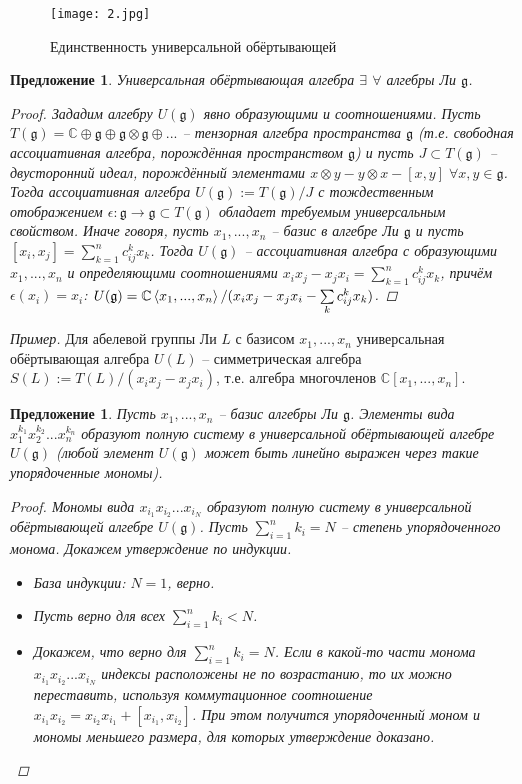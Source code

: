 \documentclass[12pt]{article}
\newtheorem{predl}[theorem]{Предложение}
\theoremstyle{definition}
\begin{document}
\begin{figure}
    \centering
    \texttt{[image: 2.jpg]}
    \caption{Единственность универсальной обёртывающей}
    \label{fig:my_label}
\end{figure}
\begin{predl}
    Универсальная обёртывающая алгебра $\exists$ $\forall$ алгебры Ли $\mathfrak{g}$.
    \begin{proof}
        Зададим алгебру $U(\mathfrak{g})$ явно образующими и соотношениями. Пусть $T(\mathfrak{g})=\mathbb{C}\oplus \mathfrak{g}\oplus\mathfrak{g}\otimes \mathfrak{g}\oplus...$ -- тензорная алгебра пространства $\mathfrak{g}$ (т.е. свободная ассоциативная алгебра, порождённая пространством $\mathfrak{g}$) и пусть $J\subset T(\mathfrak{g})$ -- двусторонний идеал, порождённый элементами $x\otimes y-y\otimes x-[x,y]\;\forall x,y\in \mathfrak{g}$. Тогда ассоциативная алгебра $U(\mathfrak{g}):=T(\mathfrak{g})/J$ с тождественным отображением $\epsilon:\mathfrak{g}\rightarrow\mathfrak{g}\subset T(\mathfrak{g})$ обладает требуемым универсальным свойством. Иначе говоря, пусть $x_1,...,x_n$ -- базис в алгебре Ли $\mathfrak{g}$ и пусть $[x_i,x_j]=\sum\limits_{k=1}^nc^k_{ij}x_k$. Тогда $U(\mathfrak{g})$ -- ассоциативная алгебра с образующими $x_1,...,x_n$ и определяющими соотношениями $x_ix_j-x_jx_i=\sum\limits_{k=1}^nc^k_{ij}x_k$, причём $\epsilon(x_i)=x_i$: $U(\mathfrak{g})=\mathbb{C}\braket{x_1,...,x_n}/(x_ix_j-x_jx_i-\sum\limits_kc^k_{ij}x_k)$.
    \end{proof}
\end{predl}
\textit{Пример.} Для абелевой группы Ли $L$ с базисом $x_1,...,x_n$ универсальная обёртывающая алгебра $U(L)$ -- симметрическая алгебра $S(L):=T(L)/(x_ix_j-x_jx_i)$, т.е. алгебра многочленов $\mathbb{C}[x_1,...,x_n]$.
\begin{predl}
    Пусть $x_1,...,x_n$ -- базис алгебры Ли $\mathfrak{g}$. Элементы вида $x_1^{k_1}x_2^{k_2}...x_n^{k_n}$ образуют полную систему в универсальной обёртывающей алгебре $U(\mathfrak{g})$ (любой элемент $U(\mathfrak{g})$ может быть линейно выражен через такие упорядоченные мономы).
    \begin{proof}
        Мономы вида $x_{i_1}x_{i_2}...x_{i_N}$ образуют полную систему в универсальной обёртывающей алгебре $U(\mathfrak{g})$. Пусть $\sum\limits_{i=1}^nk_i=N$ -- степень упорядоченного монома. Докажем утверждение по индукции.
        \begin{itemize}
            \item База индукции: $N=1$, верно.
            \item Пусть верно для всех $\sum\limits_{i=1}^nk_i<N$.
            \item Докажем, что верно для $\sum\limits_{i=1}^nk_i=N$. Если в какой-то части монома $x_{i_1}x_{i_2}...x_{i_N}$ индексы расположены не по возрастанию, то их можно переставить, используя коммутационное соотношение $x_{i_1}x_{i_2}=x_{i_2}x_{i_1}+[x_{i_1},x_{i_2}]$. При этом получится упорядоченный моном и мономы меньшего размера, для которых утверждение доказано.
        \end{itemize}
    \end{proof}
\end{predl}
\end{document}
